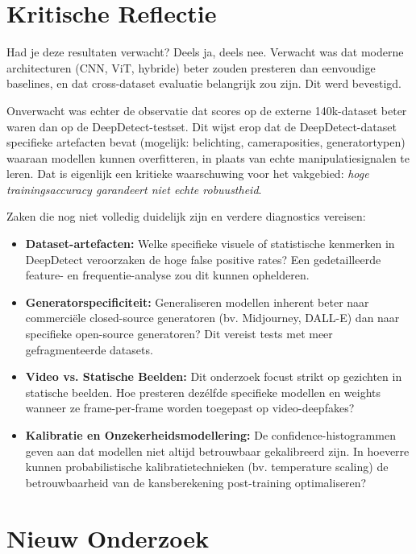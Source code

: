 \section{Kritische Reflectie}

Had je deze resultaten verwacht? Deels ja, deels nee. Verwacht was dat moderne architecturen (CNN, ViT, hybride) beter zouden presteren dan eenvoudige baselines, en dat cross-dataset evaluatie belangrijk zou zijn. Dit werd bevestigd.

Onverwacht was echter de observatie dat scores op de externe 140k-dataset beter waren dan op de DeepDetect-testset. Dit wijst erop dat de DeepDetect-dataset specifieke artefacten bevat (mogelijk: belichting, cameraposities, generatortypen) waaraan modellen kunnen overfitteren, in plaats van echte manipulatiesignalen te leren. Dat is eigenlijk een kritieke waarschuwing voor het vakgebied: \textit{hoge trainingsaccuracy garandeert niet echte robuustheid}.

Zaken die nog niet volledig duidelijk zijn en verdere diagnostics vereisen:
\begin{itemize}
    \item \textbf{Dataset-artefacten:} Welke specifieke visuele of statistische kenmerken in DeepDetect veroorzaken de hoge false positive rates? Een gedetailleerde feature- en frequentie-analyse zou dit kunnen ophelderen.
    \item \textbf{Generatorspecificiteit:} Generaliseren modellen inherent beter naar commerciële closed-source generatoren (bv. Midjourney, DALL-E) dan naar specifieke open-source generatoren? Dit vereist tests met meer gefragmenteerde datasets.
    \item \textbf{Video vs. Statische Beelden:} Dit onderzoek focust strikt op gezichten in statische beelden. Hoe presteren dezélfde specifieke modellen en weights wanneer ze frame-per-frame worden toegepast op video-deepfakes?
    \item \textbf{Kalibratie en Onzekerheidsmodellering:} De confidence-histogrammen geven aan dat modellen niet altijd betrouwbaar gekalibreerd zijn. In hoeverre kunnen probabilistische kalibratietechnieken (bv. temperature scaling) de betrouwbaarheid van de kansberekening post-training optimaliseren?
\end{itemize}

\section{Nieuw Onderzoek}

